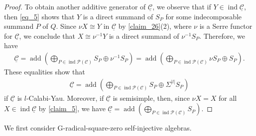 \documentclass[12pt]{amsart}
\numberwithin{equation}{subsection}
\theoremstyle{plain}
\theoremstyle{definition}
\newcommand{\add}{\operatorname{add}}
\newcommand{\Proj}{\mathcal{P}}
\newcommand{\ind}{\operatorname{ind}}
\newcommand{\C}{\mathcal{C}}
\newcommand{\sC}{\underline{\mathcal{C}}}
\begin{document}
\begin{proof}
To obtain another additive generator of $\sC$, we observe that if $Y \in \ind\sC$, then \eqref{eq_5} shows that $Y$ is a direct summand of $S_P$ for some indecomposable summand $P$ of $Q$.
Since $\nu X \cong Y$ in $\sC$ by \cref{claim_26}(2), where $\nu $ is a Serre functor for $\sC$, we conclude that $X \cong \nu ^{-1}Y$ is a direct summand of $\nu ^{-1}S_P$.
Therefore, we have
\begin{align} 
\textstyle 
\sC =\add\left(\bigoplus_{P\in\ind\Proj(\C)} S_P \oplus \nu ^{-1}S_P\right)=\add\left(\bigoplus_{P\in\ind\Proj(\C)} \nu S_P \oplus S_P\right).
\end{align}
These equalities show that 
\begin{align}
\textstyle 
\sC =\add\left(\bigoplus_{P\in\ind\Proj(\C)} S_P \oplus \Sigma^{|l|}S_P\right)
\end{align}
if $\sC$ is $l$-Calabi-Yau.
Moreover, if $\sC$ is semisimple, then, since $\nu X=X$  for all $X\in\ind\sC$ by \cref{claim_5}, we have $\sC = \add\left(\bigoplus_{P\in\ind\Proj(\C)} S_P \right)$.
\end{proof}




We first consider G-radical-square-zero self-injective algebras.
\end{document}
